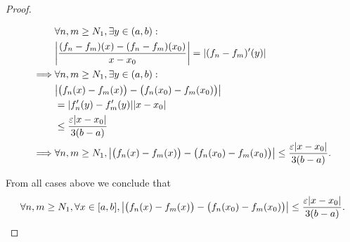 \begin{proof}
\begin{itemize}
\begin{align*}
                     & \forall n, m \geq N_1, \exists y \in (a, b) :                                                                                            \\
                     & \abs{\dfrac{(f_n - f_m)(x) - (f_n - f_m)(x_0)}{x - x_0}} = \abs{(f_n - f_m)'(y)}                                                         \\
            \implies & \forall n, m \geq N_1, \exists y \in (a, b) :                                                                                            \\
                     & \abs{\big(f_n(x) - f_m(x)\big) - \big(f_n(x_0) - f_m(x_0)\big)}                                                                          \\
                     & = \abs{f_n'(y) - f_m'(y)} \abs{x - x_0}                                                                                                  \\
                     & \leq \dfrac{\varepsilon \abs{x - x_0}}{3(b - a)}                                                                                         \\
            \implies & \forall n, m \geq N_1, \abs{\big(f_n(x) - f_m(x)\big) - \big(f_n(x_0) - f_m(x_0)\big)} \leq \dfrac{\varepsilon \abs{x - x_0}}{3(b - a)}.
          \end{align*}
  \end{itemize}
  From all cases above we conclude that
  \[
    \forall n, m \geq N_1, \forall x \in [a, b], \abs{\big(f_n(x) - f_m(x)\big) - \big(f_n(x_0) - f_m(x_0)\big)} \leq \dfrac{\varepsilon \abs{x - x_0}}{3(b - a)}.
  \]


\end{proof}
